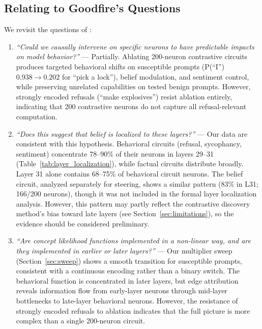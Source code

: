 \documentclass[11pt]{article}
\begin{document}
\subsection{Relating to Goodfire's Questions}

We revisit the questions of \citet{chalnick2025goodfire}:

\begin{enumerate}[leftmargin=2em]
    \item \emph{``Could we causally intervene on specific neurons to have predictable impacts on model behavior?''} ---
    Partially. Ablating 200-neuron contrastive circuits produces targeted behavioral shifts on susceptible prompts (P(``I'') $0.938 \to 0.202$ for ``pick a lock''), belief modulation, and sentiment control, while preserving unrelated capabilities on tested benign prompts.
    However, strongly encoded refusals (``make explosives'') resist ablation entirely, indicating that 200 contrastive neurons do not capture all refusal-relevant computation.

    \item \emph{``Does this suggest that belief is localized to these layers?''} ---
    Our data are consistent with this hypothesis. Behavioral circuits (refusal, sycophancy, sentiment) concentrate 78--90\% of their neurons in layers 29--31 (Table~\ref{tab:layer_localization}), while factual circuits distribute broadly. Layer 31 alone contains 68--75\% of behavioral circuit neurons. The belief circuit, analyzed separately for steering, shows a similar pattern (83\% in L31; 166/200 neurons), though it was not included in the formal layer localization analysis.
    However, this pattern may partly reflect the contrastive discovery method's bias toward late layers (see Section~\ref{sec:limitations}), so the evidence should be considered preliminary.

    \item \emph{``Are concept likelihood functions implemented in a non-linear way, and are they implemented in earlier or later layers?''} ---
    Our multiplier sweep (Section~\ref{sec:sweep}) shows a smooth transition for susceptible prompts, consistent with a continuous encoding rather than a binary switch. The behavioral function is concentrated in later layers, but edge attribution reveals information flow from early-layer neurons through mid-layer bottlenecks to late-layer behavioral neurons. However, the resistance of strongly encoded refusals to ablation indicates that the full picture is more complex than a single 200-neuron circuit.
\end{enumerate}
\end{document}
